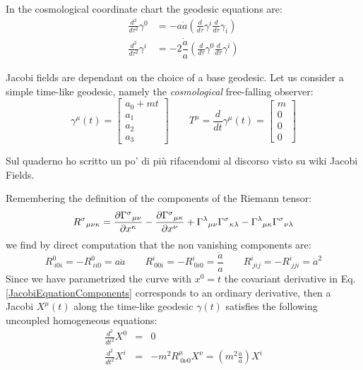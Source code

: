 \documentclass[Main]{subfiles}
\begin{document}
			In the cosmological coordinate chart the geodesic equations are:
			\begin{eqnarray}
				\frac{d^2}{d \tau^2} \gamma^0 &= - a \dot{a} \left( \frac{d}{d \tau} \gamma^i \frac{d}{d \tau}\gamma_i \right) \label{FRWGeo1}\\
				\frac{d^2}{d \tau^2} \gamma^i &= - 2 \dfrac{\dot{a}}{a} \left( \frac{d}{d \tau} \gamma^0 \frac{d}{d \tau}\gamma^i \right) 		\label{FRWGeo2}	
			\end{eqnarray}
			
			Jacobi fields are dependant on the choice of a base geodesic. 
			Let us consider a simple time-like geodesic, namely the \emph{cosmological} free-falling observer:
			\begin{displaymath}
				\gamma^\mu (t) = \begin{bmatrix}  a_0 + m t \\  a_1 \\ a_2 \\ a_3  \end{bmatrix}
				\qquad
				T^\mu=\frac{d}{d t}\gamma^\mu(t)= \begin{bmatrix}  m \\  0 \\ 0 \\ 0  \end{bmatrix}
			\end{displaymath}
\ifToninus
	\begin{Warning}
		Sul quaderno ho scritto un po' di più rifacendomi al discorso visto su wiki Jacobi Fields.
	\end{Warning}
\fi
			Remembering the definition of the components of the Riemann tensor:
			\begin{displaymath}
				{R^\sigma}_{\mu\nu\kappa} =
				  {\partial{\Gamma^\sigma}_{\mu\nu} \over \partial x^\kappa} -
				  {\partial{\Gamma^\sigma}_{\mu\kappa} \over \partial x^\nu} +
				  {\Gamma^\lambda}_{\mu\nu}{\Gamma^\sigma}_{\kappa\lambda} -
				  {\Gamma^\lambda}_{\mu\kappa}{\Gamma^\sigma}_{\nu\lambda}		
			\end{displaymath}			 
			we find by direct computation  that the non vanishing components are:
			\begin{equation}
				R^0_{\: i 0 i}= - R^{0}_{\: i i 0}= a \ddot{a} \qquad
				R^i_{\: 0 0 i}=-R^i_{\: 0 i 0}=	\dfrac{\ddot{a}}{a}\qquad
				R^i_{\: j i j} = - R^i_{\: j j i} = \dot{a}^2				
			\end{equation}
			Since we have parametrized the curve with $x^0 = t$ the covariant derivative in Eq. \ref{JacobiEquationComponents}  corresponds to an ordinary derivative, then a Jacobi $X^\mu(t)$ along the time-like geodesic $\gamma(t)$ satisfies the following uncoupled homogeneous equations:
			\begin{eqnarray}
				\frac{d^2}{d t^2} X^0  &=& 0 \label{FRWJacobi1}\\
				\frac{d^2}{d t^2} X^i &= &- m^2 R^{\mu}_{\: 0 \nu 0} X^\nu = \left( m^2 \frac{\ddot{a}}{a}\right) X^i 	\label{FRWJacobi2}	
			\end{eqnarray}			
			\vspace{2mm}
			
\end{document}
